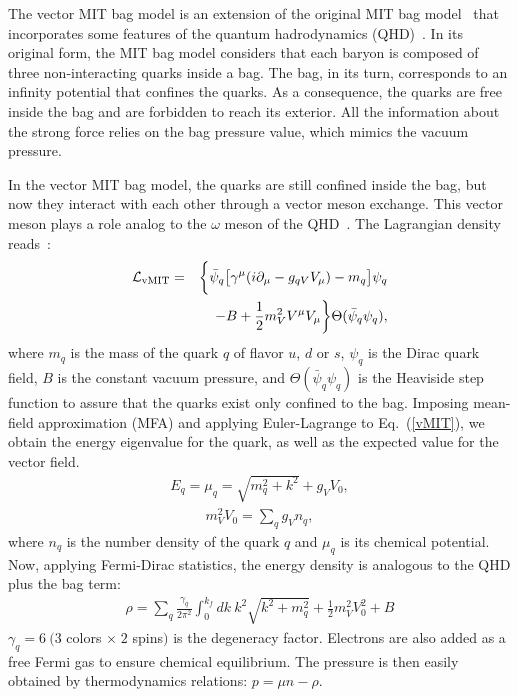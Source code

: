 \documentclass[%
reprint,
superscriptaddress,
nofootinbib,
amsmath,
amssymb,
aps,
floatfix,
showkeys,
]{revtex4-2}
\begin{document}
The vector MIT bag model is an extension of the original MIT bag model~\cite{MITbag} that incorporates some features of the quantum hadrodynamics (QHD)~\cite{Serot_1992}. In its original form, the MIT bag model considers that each baryon is composed of three non-interacting quarks inside a bag. The bag, in its turn, corresponds to an infinity potential that confines the quarks. As a consequence, the quarks are free inside the bag and are forbidden to reach its exterior. All the information about the strong force relies on the bag pressure value, which mimics the vacuum pressure.

In the vector MIT bag model, the quarks are still confined inside the bag, but now they interact with each other through a vector meson exchange. This vector meson plays a role analog to the $\omega$ meson of the QHD~\cite{Serot_1992}. The Lagrangian density reads~\cite{Lopes_2021,Lopes_2021b}:
\begin{eqnarray}
\mathcal{L}_{\rm vMIT} &=& \bigg\{ \bar{\psi}_q\big[\gamma^\mu(i\partial_\mu - g_{qV} V_\mu) - m_q\big]\psi_q  \nonumber \\
&&
- B + \frac{1}{2}m_V^2V^\mu V_\mu  \bigg\}\Theta(\bar{\psi}_q\psi_q) ,
\label{vMIT}
\end{eqnarray}
where $m_q$ is the mass of the quark $q$ of ﬂavor $u$, $d$ or $s$, $\psi_q$ is the Dirac quark ﬁeld, $B$ is the constant vacuum pressure, and $\Theta(\bar{\psi}_q\psi_q)$ is the Heaviside step function to assure that the quarks exist only conﬁned to the bag. Imposing  mean-field approximation (MFA) and applying Euler-Lagrange to Eq.~(\ref{vMIT}), we obtain the energy eigenvalue for the quark, as well as the expected value for the vector field.
\begin{eqnarray}
E_q  = \mu_q =  \sqrt{m_q^2 + k^2} + g_{V}V_0, \label{EMT}
\end{eqnarray}
\begin{eqnarray}
m_V^2V_0 = \sum_q g_{V} n_q , \nonumber
\end{eqnarray}
where $n_q$ is the number density of the quark $q$ and $\mu_q$ is its chemical potential.
Now, applying  Fermi-Dirac statistics, the energy density is analogous to the QHD plus the bag term:
\begin{eqnarray}
\rho = \sum_q \frac{\gamma_q}{2\pi^2}\int_0^{k_f} dk \ k^2 \sqrt{k^2 + m_q^{2}}  +\frac{1}{2}m_V^2V_0^2  + B  \label{edMIT}
\end{eqnarray}
$\gamma_q=6~(3$ colors $\times \; 2$ spins$)$ is the degeneracy factor. Electrons are also added as a free Fermi gas to ensure chemical equilibrium. The pressure is then easily obtained by thermodynamics relations: $p =\mu n - \rho$. 
\end{document}
